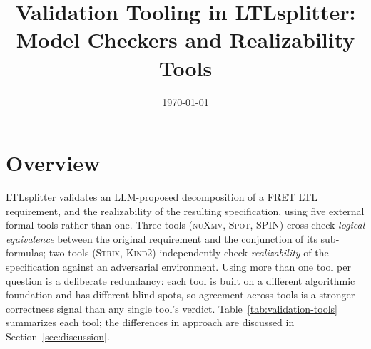 \documentclass[11pt]{article}
\title{Validation Tooling in LTLsplitter: \\ Model Checkers and Realizability Tools}
\author{}
\date{\today}
\begin{document}
\maketitle

\section{Overview}

LTLsplitter validates an LLM-proposed decomposition of a FRET LTL requirement, and the
realizability of the resulting specification, using five external formal tools rather than
one. Three tools (\textsc{nuXmv}, \textsc{Spot}, \textsc{SPIN}) cross-check \emph{logical
equivalence} between the original requirement and the conjunction of its sub-formulas; two
tools (\textsc{Strix}, \textsc{Kind2}) independently check \emph{realizability} of the
specification against an adversarial environment. Using more than one tool per question is a
deliberate redundancy: each tool is built on a different algorithmic foundation and has
different blind spots, so agreement across tools is a stronger correctness signal than any
single tool's verdict. Table~\ref{tab:validation-tools} summarizes each tool; the differences
in approach are discussed in Section~\ref{sec:discussion}.
\end{document}
